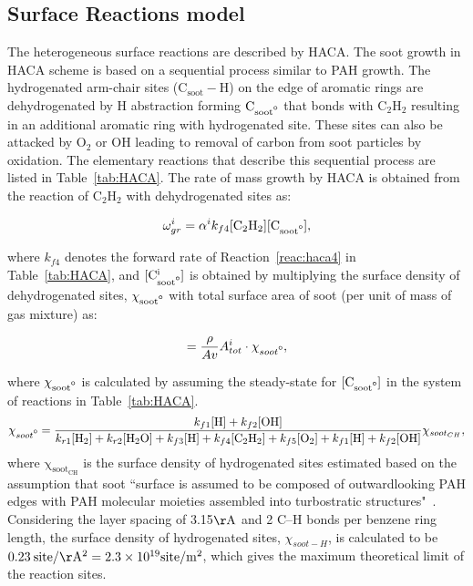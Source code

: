 \subsection{Surface Reactions model}
\label{sec:surfreacmodel}
The heterogeneous surface reactions are described by HACA. The soot growth in HACA scheme is based on a sequential process similar to PAH growth. The hydrogenated arm-chair sites ($\mathrm{C_{soot}-H}$) on the edge of aromatic rings are dehydrogenated by H abstraction forming $\mathrm{C_{soot\mbox{\textdegree}}}$ that bonds with $\mathrm{C_2H_2}$ resulting in an additional aromatic ring with hydrogenated site. These sites can also be attacked by $\mathrm{O_2}$ or $\mathrm{OH}$ leading to removal of carbon from soot particles by oxidation. The elementary reactions that describe this sequential process are listed in Table~\ref{tab:HACA}.
The rate of mass growth by HACA is obtained from the reaction of $\mathrm{C_2H_2}$ with dehydrogenated sites as:

\begin{equation}
	\omega^i_{gr} = \alpha^i k_{f4} [\mathrm{C_2H_2}][\mathrm{C_{soot\mbox{\textdegree}}}]
	\label{eqn:hacaRate},
\end{equation}

  \noindent  where ${k_{f4}}$ denotes the forward rate of Reaction~\ref{reac:haca4} in Table~\ref{tab:HACA}, and $\mathrm{[C^i_{soot\mbox{\textdegree}}]}$ is obtained by multiplying the surface density of dehydrogenated sites, $\mathrm{\chi_{soot\mbox{\textdegree}}}$ with total surface area of soot (per unit of mass of gas mixture) as:

\begin{equation}
	[\mathrm{C^i_{soot\mbox{\textdegree}}}] = \frac{\rho}{Av}A^i_{tot}\cdot\chi_{soot\mbox{\textdegree}}
	\label{eqn:csoot0},
\end{equation}

   \noindent where $\mathrm{\chi_{soot\mbox{\textdegree}}}$ is calculated by assuming the steady-state for $\mathrm{[C_{soot\mbox{\textdegree}}]}$ in the system of reactions in Table~\ref{tab:HACA}.
\begin{equation}
	\chi_{soot\mbox{\textdegree}} = 
	\frac
	{k_{f1}[\mathrm{H}]+k_{f2}[\mathrm{OH}]}
	{k_{r1}[\mathrm{H_2}]+k_{r2}[\mathrm{H_2O}]+k_{f3}[\mathrm{H}]+k_{f4}[\mathrm{C_2H_2}]+k_{f5}[\mathrm{O_2}]+k_{f1}[\mathrm{H}]+k_{f2}[\mathrm{OH}]} \chi_{soot_{CH}}
	\label{eqn:chisoot0},
\end{equation}
   \noindent where $\mathrm{\chi_{soot_{CH}}}$ is the surface density of hydrogenated sites estimated based on the assumption that soot ``surface is assumed to be composed of outwardlooking PAH edges with PAH molecular moieties assembled into turbostratic structures"~\citep{frenklach2019new}. Considering the layer spacing of 3.15$\mathrm{\AA}$ and 2 C–H bonds per benzene ring length, the surface density of hydrogenated sites, $\chi_{{soot}-H}$, is calculated to be $0.23\:\mathrm{site/\AA^2}=2.3\times10^{19} \mathrm{site/m^2}$, which gives the maximum theoretical limit of the reaction sites.

